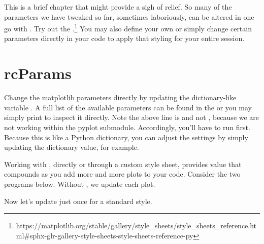 This is a brief chapter that might provide a sigh of relief. So many of the parameters we have tweaked so far, sometimes laboriously, can be altered in one go with . Try out the .\footnote{https://matplotlib.org/stable/gallery/style\_sheets/style\_sheets\_reference.html\#sphx-glr-gallery-style-sheets-style-sheets-reference-py} You may also define your own or simply change certain parameters directly in your code to apply that styling for your entire session. 

\section{rcParams}

Change the matplotlib parameters directly by updating the dictionary-like variable . A full list of the available parameters can be found in the   or you may simply print  to inspect it directly. Note the above line is  and not , because we are not working within the pyplot submodule. Accordingly, you'll have to run  first. Because this is like a Python dictionary, you can adjust the settings by simply updating the dictionary value,  for example. 

Working with , directly or through a custom style sheet, provides value that compounds as you add more and more plots to your code.  Consider the two programs below. Without , we update each plot.


\vspace{-0.3cm}
Now let's update  just once for a standard style.

\vspace{-0.3cm}


